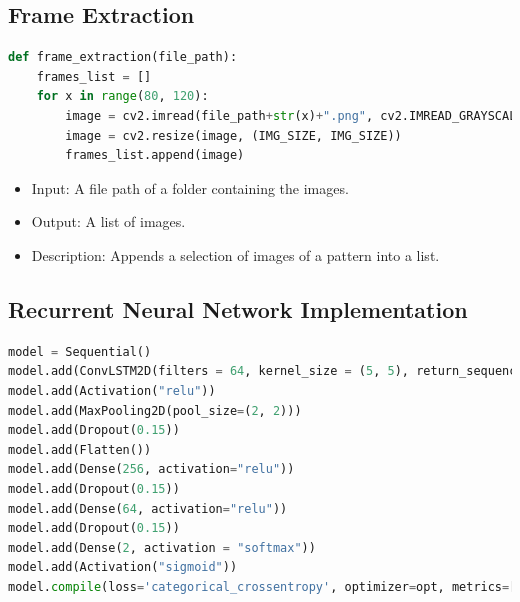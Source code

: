 \documentclass[12pt]{article}
\numberwithin{figure}{section} %
\begin{document}
\newpage
\subsection{Frame Extraction}
\label{subsection:Frame Extraction}
\begin{lstlisting}[language = Python]
def frame_extraction(file_path):
    frames_list = []
    for x in range(80, 120):
        image = cv2.imread(file_path+str(x)+".png", cv2.IMREAD_GRAYSCALE)
        image = cv2.resize(image, (IMG_SIZE, IMG_SIZE))
        frames_list.append(image)
\end{lstlisting}
\vspace{-1.5em}
\begin{itemize}[leftmargin = 0.5cm, topsep=0pt,itemsep=-1ex,partopsep=1ex,parsep=1ex]
\item Input: A file path of a folder containing the images.  
\item Output: A list of images.   
\item Description: Appends a selection of images of a pattern into a list. 
\end{itemize}

\subsection{Recurrent Neural Network Implementation}
\label{subsection:Recurrent Neural Network Implementation}
\begin{lstlisting}[language = Python]
model = Sequential()
model.add(ConvLSTM2D(filters = 64, kernel_size = (5, 5), return_sequences = False, data_format = "channels_last", input_shape = X.shape[1:]))
model.add(Activation("relu"))
model.add(MaxPooling2D(pool_size=(2, 2)))
model.add(Dropout(0.15))
model.add(Flatten())
model.add(Dense(256, activation="relu"))
model.add(Dropout(0.15))
model.add(Dense(64, activation="relu"))
model.add(Dropout(0.15))
model.add(Dense(2, activation = "softmax"))
model.add(Activation("sigmoid"))
model.compile(loss='categorical_crossentropy', optimizer=opt, metrics=["accuracy"])
\end{lstlisting}
\end{document}
